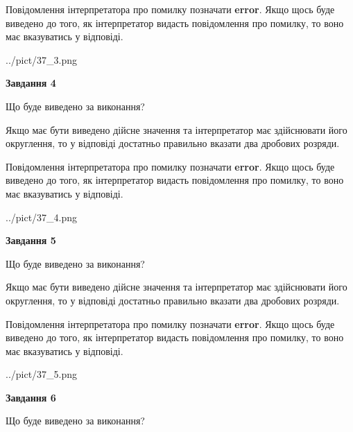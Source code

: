 \documentclass[12pt, ukrainian]{article}
\begin{document}
{\begin {Large}
Повідомлення інтерпретатора про помилку позначати \textbf{error}.
Якщо щось буде виведено до того, як інтерпретатор видасть повідомлення про помилку, 
то воно має вказуватись у відповіді. \par

\begin{center}
	{../pict/37_3.png}
\end{center}
\newpage

{\begin {center}\textbf{Завдання 4}\end {center}}\par
Що буде виведено за виконання? \par

Якщо має бути виведено дійсне значення та інтерпретатор має здійснювати його округлення, 
то у відповіді достатньо правильно вказати два дробових розряди.

Повідомлення інтерпретатора про помилку позначати \textbf{error}.
Якщо щось буде виведено до того, як інтерпретатор видасть повідомлення про помилку, 
то воно має вказуватись у відповіді. \par

\begin{center}
	{../pict/37_4.png}
\end{center}
\newpage

{\begin {center}\textbf{Завдання 5}\end {center}}\par
Що буде виведено за виконання? \par

Якщо має бути виведено дійсне значення та інтерпретатор має здійснювати його округлення, 
то у відповіді достатньо правильно вказати два дробових розряди.

Повідомлення інтерпретатора про помилку позначати \textbf{error}.
Якщо щось буде виведено до того, як інтерпретатор видасть повідомлення про помилку, 
то воно має вказуватись у відповіді. \par

\begin{center}
	{../pict/37_5.png}
\end{center}
\newpage

{\begin {center}\textbf{Завдання 6}\end {center}}\par
Що буде виведено за виконання? \par


\end{Large}}
\end{document}
